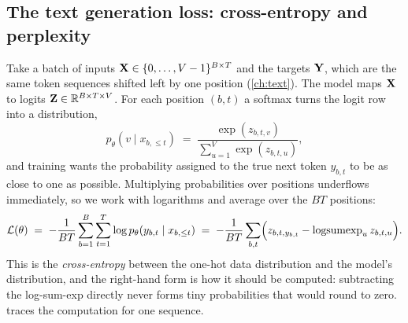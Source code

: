 \subsection{The text generation loss: cross-entropy and perplexity}\label{sec:pretrain:loss}

Take a batch of inputs $\mathbf{X}\in\{0,\dots,V-1\}^{B\times T}$ and the targets $\mathbf{Y}$, which
are the same token sequences shifted left by one position (\cref{ch:text}). The model maps
$\mathbf{X}$ to logits $\mathbf{Z}\in\mathbb{R}^{B\times T\times V}$. For each position $(b,t)$ a softmax
turns the logit row into a distribution,
\begin{equation}
p_\theta(v\mid x_{b,\le t}) \;=\; \frac{\exp(z_{b,t,v})}{\sum_{u=1}^{V}\exp(z_{b,t,u})},
\label{eq:pretrain:softmax}
\end{equation}
and training wants the probability assigned to the true next token $y_{b,t}$ to be as close to
one as possible. Multiplying probabilities over positions underflows immediately, so we work
with logarithms and average over the $BT$ positions:
\begin{equation}
\mathcal{L}(\theta) \;=\; -\frac{1}{BT}\sum_{b=1}^{B}\sum_{t=1}^{T}
  \log p_\theta\!\left(y_{b,t}\mid x_{b,\le t}\right)
\;=\; -\frac{1}{BT}\sum_{b,t}\Bigl(z_{b,t,y_{b,t}} - \operatorname{logsumexp}_u z_{b,t,u}\Bigr).
\label{eq:pretrain:ce}
\end{equation}
This is the \emph{cross-entropy} between the one-hot data distribution and the model's
distribution, and the right-hand form is how it should be computed: subtracting the
log-sum-exp directly never forms tiny probabilities that would round to zero.
 traces the computation for one sequence.


